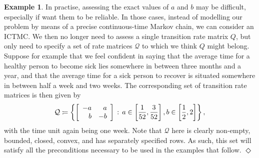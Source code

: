\documentclass[10pt,a4paper]{paper}
\theoremstyle{definition}
\newtheorem{exmp}{Example}%
\newcommand{\states}{\mathcal{X}}
\newcommand{\gambles}{\mathcal{L}}
\newcommand{\gamblesX}{\gambles(\states)}
\newcommand{\rateset}{\mathcal{Q}}
\newcommand{\lrate}{\underline{Q}}
\newcommand{\coloneqq}{:\!=}
\newcommand{\exampleend}{\hfill$\Diamond$}
\newcommand{\ictmc}{{ICTMC}}
\begin{document}
\begin{exmp}
In practise, assessing the exact values of $a$ and $b$ may be difficult, especially if want them to be reliable. In those cases, instead of modelling our problem by means of a precise continuous-time Markov chain, we can consider an \ictmc. We then no longer need to assess a single transition rate matrix $Q$, but only need to specify a set of rate matrices $\rateset$ to which we think $Q$ might belong. Suppose for example that we feel confident in saying that the average time for a healthy person to become sick lies somewhere in between three months and a year, and that the average time for a sick person to recover is situated somewhere in between half a week and two weeks. The corresponding set of transition rate matrices is then given by
\vspace{3pt}
\begin{equation}\label{eq:num_example_rateset_params}
\rateset \coloneqq \left\{\left[\begin{array}{rr}
-a & a \\
b & -b
\end{array}\right]\,:\,a\in\left[\frac{1}{52},\frac{3}{52}\right], b\in\left[\frac{1}{2},2\right]\right\},
\vspace{3pt}
\end{equation}
with the time unit again being one week. Note that $\rateset$ here is clearly non-empty, bounded, closed, convex, and has separately specified rows. As such, this set will satisfy all the preconditions necessary to be used in the examples that follow.
\exampleend
\end{exmp}

\end{document}
